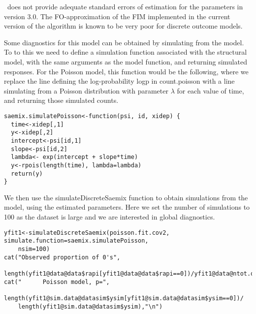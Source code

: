  \monolix~does not provide adequate standard errors of estimation for the parameters in version 3.0. The FO-approximation of the FIM implemented in the current version of the algorithm is known to be very poor for discrete outcome models.

Some diagnostics for this model can be obtained by simulating from the model. To to this we need to define a simulation function associated with the structural model, with the same arguments as the model function, and returning simulated responses. For the Poisson model, this function would be the following, where we replace the line defining the log-probability {\sf logp} in {\sf count.poisson} with a line simulating from a Poisson distribution with parameter $\lambda$ for each value of time, and returning those simulated counts.
\begin{verbatim}
saemix.simulatePoisson<-function(psi, id, xidep) {
  time<-xidep[,1]
  y<-xidep[,2]
  intercept<-psi[id,1]
  slope<-psi[id,2]
  lambda<- exp(intercept + slope*time)
  y<-rpois(length(time), lambda=lambda)
  return(y)
}
\end{verbatim}

We then use the {\sf simulateDiscreteSaemix} function to obtain simulations from the model, using the estimated parameters. Here we set the number of simulations to 100 as the dataset is large and we are interested in global diagnostics.
\begin{verbatim}
yfit1<-simulateDiscreteSaemix(poisson.fit.cov2, simulate.function=saemix.simulatePoisson, 
    nsim=100)
cat("Observed proportion of 0's", 
     length(yfit1@data@data$rapi[yfit1@data@data$rapi==0])/yfit1@data@ntot.obs,"\n")
cat("      Poisson model, p=",
    length(yfit1@sim.data@datasim$ysim[yfit1@sim.data@datasim$ysim==0])/
    length(yfit1@sim.data@datasim$ysim),"\n") 
\end{verbatim}

